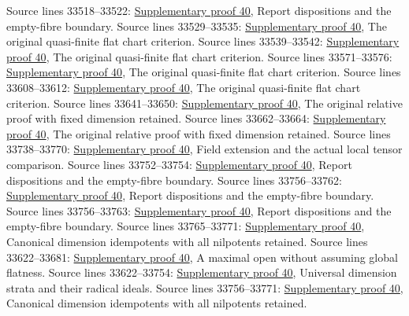 \begin{AlgebraSourceRoutes}
 Source lines 33518--33522: \hyperlink{algebra_cm_open_notes_20260928}{Supplementary proof 40}, Report dispositions and the empty-fibre boundary.
 Source lines 33529--33535: \hyperlink{algebra_cm_open_notes_20260928}{Supplementary proof 40}, The original quasi-finite flat chart criterion.
 Source lines 33539--33542: \hyperlink{algebra_cm_open_notes_20260928}{Supplementary proof 40}, The original quasi-finite flat chart criterion.
 Source lines 33571--33576: \hyperlink{algebra_cm_open_notes_20260928}{Supplementary proof 40}, The original quasi-finite flat chart criterion.
 Source lines 33608--33612: \hyperlink{algebra_cm_open_notes_20260928}{Supplementary proof 40}, The original quasi-finite flat chart criterion.
 Source lines 33641--33650: \hyperlink{algebra_cm_open_notes_20260928}{Supplementary proof 40}, The original relative proof with fixed dimension retained.
 Source lines 33662--33664: \hyperlink{algebra_cm_open_notes_20260928}{Supplementary proof 40}, The original relative proof with fixed dimension retained.
 Source lines 33738--33770: \hyperlink{algebra_cm_open_notes_20260928}{Supplementary proof 40}, Field extension and the actual local tensor comparison.
 Source lines 33752--33754: \hyperlink{algebra_cm_open_notes_20260928}{Supplementary proof 40}, Report dispositions and the empty-fibre boundary.
 Source lines 33756--33762: \hyperlink{algebra_cm_open_notes_20260928}{Supplementary proof 40}, Report dispositions and the empty-fibre boundary.
 Source lines 33756--33763: \hyperlink{algebra_cm_open_notes_20260928}{Supplementary proof 40}, Report dispositions and the empty-fibre boundary.
 Source lines 33765--33771: \hyperlink{algebra_cm_open_notes_20260928}{Supplementary proof 40}, Canonical dimension idempotents with all nilpotents retained.
 Source lines 33622--33681: \hyperlink{algebra_cm_open_notes_20260928}{Supplementary proof 40}, A maximal open without assuming global flatness.
 Source lines 33622--33754: \hyperlink{algebra_cm_open_notes_20260928}{Supplementary proof 40}, Universal dimension strata and their radical ideals.
 Source lines 33756--33771: \hyperlink{algebra_cm_open_notes_20260928}{Supplementary proof 40}, Canonical dimension idempotents with all nilpotents retained.
\end{AlgebraSourceRoutes}

